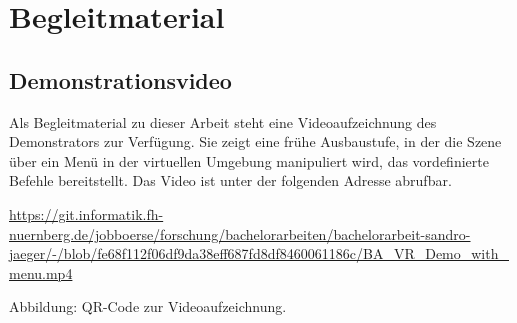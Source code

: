 %   
%

\chapter{Begleitmaterial}
\label{anh:begleitmaterial}

\section{Demonstrationsvideo}
\label{anh:video}

Als Begleitmaterial zu dieser Arbeit steht eine Videoaufzeichnung des Demonstrators zur Verfügung.
Sie zeigt eine frühe Ausbaustufe, in der die Szene über ein Menü in der virtuellen Umgebung manipuliert wird, das vordefinierte Befehle bereitstellt.
Das Video ist unter der folgenden Adresse abrufbar.

\begin{center}
\url{https://git.informatik.fh-nuernberg.de/jobboerse/forschung/bachelorarbeiten/bachelorarbeit-sandro-jaeger/-/blob/fe68f112f06df9da38eff687fd8df8460061186c/BA_VR_Demo_with_menu.mp4}

\vspace{1em}

\vspace{0.5em}
{\footnotesize Abbildung: QR-Code zur Videoaufzeichnung.}
\end{center}